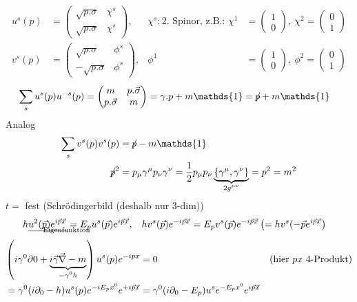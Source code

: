 	\begin{align*}
		u^s (p) &=
		\begin{pmatrix}
			\sqrt{p. \sigma} & \chi^s \\
			\sqrt{p. \sigma} & \chi^s
		\end{pmatrix},&
		\chi^s: \text{2. Spinor, z.B.: } \chi^1 &=
		\begin{pmatrix}
			1 \\ 0
		\end{pmatrix},~
		\chi^2 = 
		\begin{pmatrix}
			0 \\1
		\end{pmatrix}
		\\
		v^s (p) &=
		\begin{pmatrix}
		\sqrt{p. \sigma} & \phi^s \\
		-\sqrt{p. \sigma} & \phi^s
		\end{pmatrix},&
		\phi^1 &=
		\begin{pmatrix}
		1 \\ 0
		\end{pmatrix},~
		\phi^2 = 
		\begin{pmatrix}
		0 \\1
		\end{pmatrix}
	\end{align*}
	\begin{align*}
		\sum_s u^s(p) u^{-s} (p) &= 
		\begin{pmatrix}
			m & p. \vec{\sigma} \\
			p.\vec{\sigma} & m
		\end{pmatrix}
		= \gamma. p + m\mathds{1} = \durch{p} + m\mathds{1}
	\end{align*}
Analog
	\begin{align*}
		\sum_s v^s(p) v^s(p) &= \durch{p} - m\mathds{1}\\
		\durch{p}^2 &= p_\mu \gamma^\mu p_\nu \gamma^\nu = 
		\frac{1}{2} p_\mu p_\nu \underbrace{\{\gamma^\mu, \gamma^\nu\}}_{\mathclap{2g^{\mu\nu}}} = p^2 = m^2
	\end{align*}
$t =$ fest (Schrödingerbild (deshalb nur 3-dim))
	\begin{align*}
		h \underline{u^2(\vec{p}) e^{i \vec{p} \vec{x}}}_{\mathclap{\text{Eigenfunktion}}} &=
		E_p u^s(\vec{p}) e^{i\vec{p} \vec{x}},&
		hv^s(\vec{p}) e^{-i\vec{p} \vec{x}} &= 
		E_p v^s(\vec{p}) e^{-i\vec{p} \vec{x}} 
		\left(
			= hv^s(-\vec{p} e^{i\vec{p} \vec{x}}
		\right)
	\end{align*}
	\begin{align*}
		\left(
			i \gamma^0 \partial 0 + \underbrace{i \vec{\gamma} \vec{\nabla} - m}_{\mathclap{-\gamma^0 h}}
		\right) u^s(p) e^{-ipx} &= 0 &(\text{hier } px \text{ 4-Produkt}) \\
		= \gamma^0 (i \partial_0 - h) u^s (p) e^{-i E_p x^0} e^{+ i\vec{p} \vec{x}}
		&= \gamma^0 (i \partial_0 - E_p) u^s e^{-E_p x^0} e^{i \vec{p} \vec{x}}
	\end{align*}
